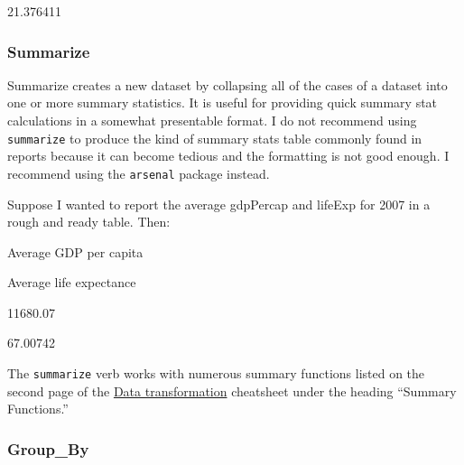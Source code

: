 \documentclass[
]{book}
\newenvironment{Shaded}{\begin{snugshade}}{\end{snugshade}}
\newcommand{\DataTypeTok}[1]{\textcolor[rgb]{0.13,0.29,0.53}{#1}}
\newcommand{\DecValTok}[1]{\textcolor[rgb]{0.00,0.00,0.81}{#1}}
\newcommand{\KeywordTok}[1]{\textcolor[rgb]{0.13,0.29,0.53}{\textbf{#1}}}
\newcommand{\NormalTok}[1]{#1}
\newcommand{\OperatorTok}[1]{\textcolor[rgb]{0.81,0.36,0.00}{\textbf{#1}}}
\newcommand{\StringTok}[1]{\textcolor[rgb]{0.31,0.60,0.02}{#1}}
\begin{document}
21.376411

\hypertarget{summarize}{%
\subsubsection*{Summarize}\label{summarize}}

Summarize creates a new dataset by collapsing all of the cases of a dataset into one or more summary statistics. It is useful for providing quick summary stat calculations in a somewhat presentable format. I do not recommend using \texttt{summarize} to produce the kind of summary stats table commonly found in reports because it can become tedious and the formatting is not good enough. I recommend using the \texttt{arsenal} package instead.

Suppose I wanted to report the average gdpPercap and lifeExp for 2007 in a rough and ready table. Then:

\begin{Shaded}
\end{Shaded}

Average GDP per capita

Average life expectance

11680.07

67.00742

The \texttt{summarize} verb works with numerous summary functions listed on the second page of the \href{https://github.com/rstudio/cheatsheets/raw/master/data-transformation.pdf}{Data transformation} cheatsheet under the heading ``Summary Functions.''

\hypertarget{group_by}{%
\subsubsection*{Group\_By}\label{group_by}}
\end{document}
